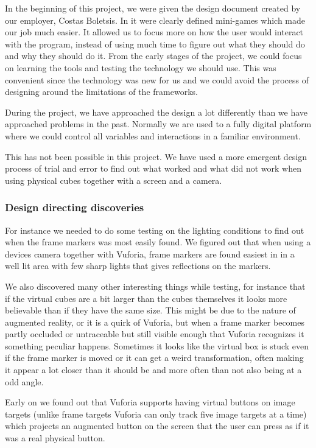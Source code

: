 In the beginning of this project, we were given the design document created by our employer, Costas Boletsis. In it were clearly defined mini-games which made our job much easier. It allowed us to focus more on how the user would interact with the program, instead of using much time to figure out what they should do and why they should do it. From the early stages of the project, we could focus on learning the tools and testing the technology we should use. This was convenient since the technology was new for us and we could avoid the process of designing around the limitations of the frameworks.

During the project, we have approached the design a lot differently than we have approached problems in the past. Normally we are used to a fully digital platform where we could control all variables and interactions in a familiar environment.

This has not been possible in this project. We have used a more emergent design process of trial and error to find out what worked and what did not work when using physical cubes together with a screen and a camera.

\subsubsection{Design directing discoveries}
For instance we needed to do some testing on the lighting conditions to find out when the frame markers was most easily found. We figured out that when using a devices camera together with Vuforia, frame markers are found easiest in in a well lit area with few sharp lights that gives reflections on the markers.

We also discovered many other interesting things while testing, for instance that if the virtual cubes are a bit larger than the cubes themselves it looks more believable than if they have the same size. 
This might be due to the nature of augmented reality, or it is a quirk of Vuforia, but when a frame marker becomes partly occluded or untraceable but still visible enough that Vuforia recognizes it something peculiar happens.
Sometimes it looks like the virtual box is stuck even if the frame marker is moved or it can get a weird transformation, often making it appear a lot closer than it should be and more often than not also being at a odd angle.


Early on we found out that Vuforia supports having virtual buttons on image targets (unlike frame targets Vuforia can only track five image targets at a time) which projects an augmented button on the screen that the user can press as if it was a real physical button.

